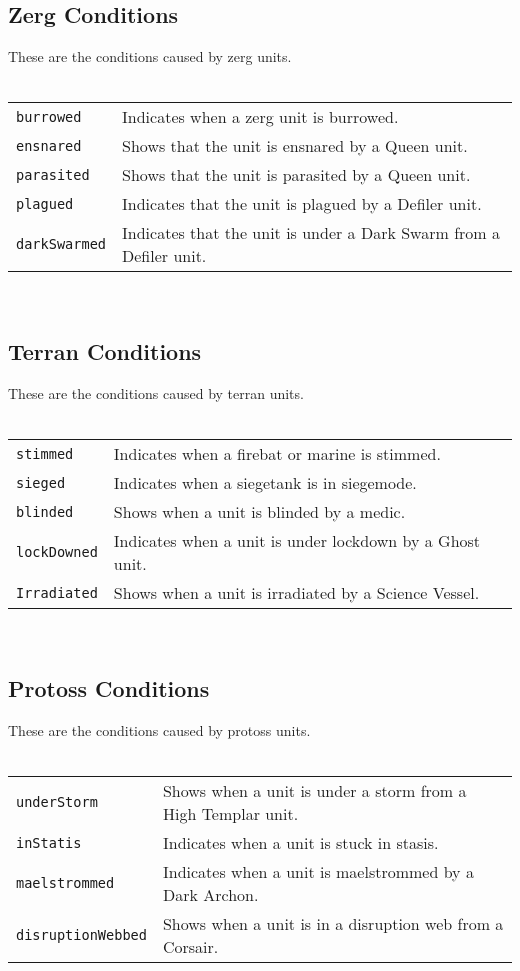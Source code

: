 \subsection{Zerg Conditions}
These are the conditions caused by zerg units.\\
\\
\begin{tabularx}{\textwidth}{lX}
\verb|burrowed| & Indicates when a zerg unit is burrowed. \\
\verb|ensnared| & Shows that the unit is ensnared by a Queen unit. \\
\verb|parasited| & Shows that the unit is parasited by a Queen unit. \\
\verb|plagued| & Indicates that the unit is plagued by a Defiler unit. \\
\verb|darkSwarmed| & Indicates that the unit is under a Dark Swarm from a Defiler unit. \\
\end{tabularx} \\

\subsection{Terran Conditions}
These are the conditions caused by terran units.\\
\\
\begin{tabularx}{\textwidth}{lX}
 \verb|stimmed| & Indicates when a firebat or marine is stimmed.\\
 \verb|sieged| & Indicates when a siegetank is in siegemode.\\
 \verb|blinded| & Shows when a unit is blinded by a medic. \\
 \verb|lockDowned| & Indicates when a unit is under lockdown by a Ghost unit. \\
 \verb|Irradiated| & Shows when a unit is irradiated by a Science Vessel. \\
\end{tabularx} \\

\subsection{Protoss Conditions}
These are the conditions caused by protoss units.\\
\\
\begin{tabularx}{\textwidth}{lX}
\verb|underStorm| & Shows when a unit is under a storm from a High Templar unit. \\
\verb|inStatis| & Indicates when a unit is stuck in stasis. \\
\verb|maelstrommed| & Indicates when a unit is maelstrommed by a Dark Archon. \\
\verb|disruptionWebbed| & Shows when a unit is in a disruption web from a Corsair. \\
\end{tabularx} \\

